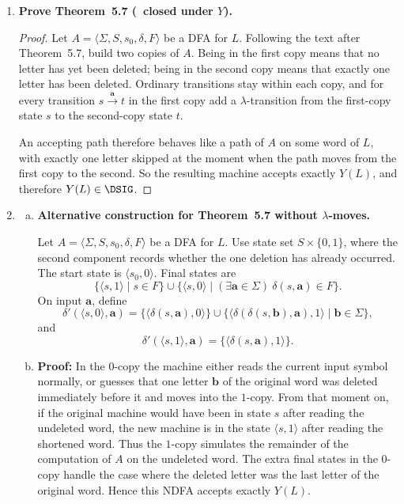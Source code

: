 \begin{enumerate}[{5.}1. ]
\begin{proof}
Thus $x$ is accepted by $A_Z$ iff there exists some $w\in L$ from which $x$ can
be obtained by deleting zero or more letters, i.e., iff $x\in Z(L)$.  Hence
$Z(L)\in\DSIG$.
\end{proof}

\item \textbf{Prove Theorem~5.7 (\DSIG\ closed under $Y$).}

\begin{proof}
Let $A=\langle\Sigma,S,s_0,\delta,F\rangle$ be a DFA for $L$.  Following the text
after Theorem~5.7, build two copies of $A$.  Being in the first copy means that
no letter has yet been deleted; being in the second copy means that exactly one
letter has been deleted.  Ordinary transitions stay within each copy, and for
every transition $s\xrightarrow{\pmb{a}}t$ in the first copy add a
$\lambda$-transition from the first-copy state $s$ to the second-copy state $t$.

An accepting path therefore behaves like a path of $A$ on some word of $L$, with
exactly one letter skipped at the moment when the path moves from the first copy
to the second.  So the resulting machine accepts exactly $Y(L)$, and therefore
$Y(L)\in\DSIG$.
\end{proof}

\item \begin{enumerate}[(a)]
  \item \textbf{Alternative construction for Theorem~5.7 without $\lambda$-moves.}

  Let $A=\langle\Sigma,S,s_0,\delta,F\rangle$ be a DFA for $L$.  Use state set
  $S\times\{0,1\}$, where the second component records whether the one deletion
  has already occurred.  The start state is $\langle s_0,0\rangle$.  Final states
  are
  \[
  \{\langle s,1\rangle\mid s\in F\}\cup
  \{\langle s,0\rangle\mid(\exists \pmb{a}\in\Sigma)\ \delta(s,\pmb{a})\in F\}.
  \]
  On input $\pmb{a}$, define
  \[
  \delta'(\langle s,0\rangle,\pmb{a})=
  \{\langle \delta(s,\pmb{a}),0\rangle\}\cup
  \{\langle \delta(\delta(s,\pmb{b}),\pmb{a}),1\rangle\mid \pmb{b}\in\Sigma\},
  \]
  and
  \[
  \delta'(\langle s,1\rangle,\pmb{a})=
  \{\langle \delta(s,\pmb{a}),1\rangle\}.
  \]

  \item \textbf{Proof:}  In the $0$-copy the machine either reads the current
  input symbol normally, or guesses that one letter $\pmb{b}$ of the original
  word was deleted immediately before it and moves into the $1$-copy.  From that
  moment on, if the original machine would have been in state $s$ after reading
  the undeleted word, the new machine is in the state $\langle s,1\rangle$ after
  reading the shortened word. Thus the $1$-copy simulates the remainder of the
  computation of $A$ on the undeleted word. The extra final states in the
  $0$-copy handle the case where the deleted letter was the last letter of the
  original word. Hence this NDFA accepts exactly $Y(L)$.
\end{enumerate}


\end{enumerate}
